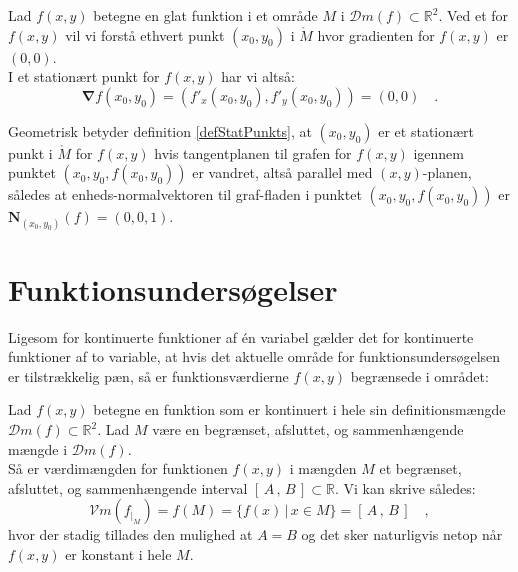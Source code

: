 \begin{definition}\label{defStatPunkts}
Lad $f(x,y)$ betegne en glat funktion i et område $M$ i $\mathcal{D}m(f) \subset \mathbb{R}^{2}$.
Ved et  for $f(x,y)$ vil vi forstå ethvert punkt $(x_{0}, y_{0})$ i $\mathring{M}$ hvor gradienten for $f(x,y)$ er $(0, 0)$.\\

 I et stationært punkt for $f(x,y)$ har vi altså:
\begin{equation}
\bm{\nabla}f(x_{0}, y_{0}) = \left(f'_{x}(x_{0}, y_{0}), f'_{y}(x_{0}, y_{0}) \right) = (0, 0) \quad.
\end{equation}

\end{definition}

\begin{aha}
Geometrisk betyder definition \ref{defStatPunkts}, at $(x_{0}, y_{0})$ er et stationært punkt i $\mathring{M}$ for $f(x,y)$ hvis tangentplanen til grafen for $f(x,y)$ igennem punktet $(x_{0}, y_{0}, f(x_{0}, y_{0}))$ er vandret, altså  parallel med $(x,y)$-planen, således at enheds-normalvektoren til graf-fladen i punktet $(x_{0}, y_{0}, f(x_{0}, y_{0}))$ er $\mathbf{N}_{(x_{0}, y_{0})}(f) = (0,0,1)$.
\end{aha}





\section{Funktionsundersøgelser} \label{secFunkUnders}

Ligesom for kontinuerte funktioner af \'{e}n variabel gælder det for kontinuerte funktioner af to variable, at hvis det aktuelle område for funktionsundersøgelsen er tilstrækkelig pæn, så er funktionsværdierne $f(x,y)$ begrænsede i området:

\begin{theorem} \label{thmHovedsaetnKontTo}
Lad $f(x,y)$ betegne en funktion som er kontinuert i hele sin definitionsmængde $\mathcal{D}m(f) \subset \mathbb{R}^{2}$.
Lad $M$ være en begrænset, afsluttet, og sammenhængende mængde i $\mathcal{D}m(f)$. \\

Så er værdimængden for funktionen $f(x,y)$ i mængden $M$ et
begrænset, afsluttet, og sammenhængende interval $[\, A \, , \, B \, ] \subset \mathbb{R}$. Vi kan skrive således:
\begin{equation}
\mathcal{V}m(f_{|_{M}}) = f(M) = \{ f(x)\, | \, x\in M \} =  [\, A \, , \, B \, ] \quad ,
\end{equation}
hvor der stadig tillades den mulighed at $A = B$ og det sker naturligvis netop når $f(x,y)$ er konstant i hele $M$.
\end{theorem}

